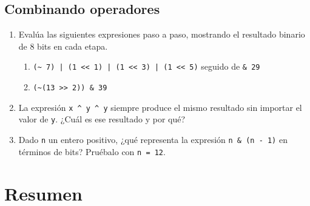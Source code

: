\documentclass[12pt, oneside]{article}
\begin{document}
\subsection{Combinando operadores}

\begin{enumerate}[resume]

  \item Evalúa las siguientes expresiones paso a paso, mostrando el resultado
        binario de 8 bits en cada etapa.
        \begin{enumerate}
          \item \texttt{(\textasciitilde{} 7) | (1 << 1) | (1 << 3) | (1 << 5)}
                seguido de \texttt{\& 29}
          \item \texttt{(\textasciitilde(13 >> 2)) \& 39}
        \end{enumerate}

  \item La expresión \texttt{x \textasciicircum{} y \textasciicircum{} y}
        siempre produce el mismo resultado sin importar el valor de \texttt{y}.
        ¿Cuál es ese resultado y por qué?

  \item Dado \texttt{n} un entero positivo, ¿qué representa la expresión
        \texttt{n \& (n - 1)} en términos de bits? Pruébalo con \texttt{n = 12}.

\end{enumerate}

\section{Resumen}
\end{document}
